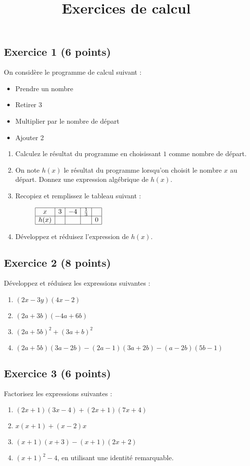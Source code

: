 \documentclass[14 pt, fleqn, pstricks]{extarticle}
\title{Exercices de calcul}
\date{}
\theoremstyle{plain}
\begin{document}
	 


\subsection*{Exercice 1 (6 points) }	 
	 
On considère le programme de calcul suivant : 
\begin{itemize}
\item Prendre un nombre
\item Retirer 3
\item Multiplier par le nombre de départ 
\item Ajouter 2
\end{itemize}
\begin{enumerate}
\item Calculez le résultat du programme en choisissant $1$ comme nombre de départ.
\item  On note $h(x)$ le résultat du programme lorsqu'on choisit le nombre $x$ au départ. Donnez une expression algébrique de $h(x)$.
\item  Recopiez et remplissez le tableau suivant : 
	 
\begin{figure}[H]
\center
$\begin{array}{|c|c|c|c|c|}
\hline
 x &  3 & -4 & \frac13 &      \\
\hline
h(x)&   & & & 0    \\
\hline
\end{array}$
\end{figure}
\item  Développez et réduisez l'expression de $h(x)$. 
\end{enumerate} 

\subsection*{Exercice 2 (8 points)}

Développez et réduisez les expressions suivantes : 
\begin{enumerate}
\item $(2x-3y)(4x-2)$
\item $(2a+3b)(-4a+6b)$
\item $(2a+5b)^2 + (3a+b)^2$
\item $(2a+5b)(3a-2b)-(2a-1)(3a+2b)-(a-2b)(5b-1)$
\end{enumerate}
    
\subsection*{Exercice 3 (6 points)}
    
Factorisez les expressions suivantes : 
\begin{enumerate}
\item $(2x+1)(3x-4) + (2x+1)(7x+4) $
\item $x(x+1) + (x-2)x$
\item $(x+1)(x+3) - (x+1)(2x+2)$
\item $(x+1)^2 - 4$, en utilisant une identité remarquable.
\end{enumerate}

 	
\end{document}
